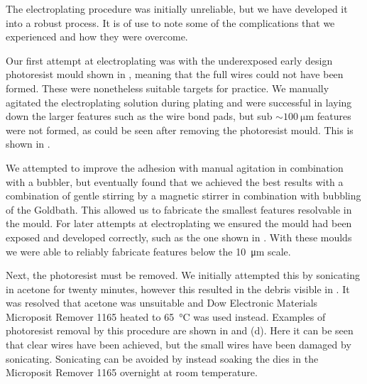 The electroplating procedure was initially unreliable, but we have developed
it into a robust process. It is of use to note some of the complications
that we experienced and how they were overcome. 

Our first attempt at electroplating was with the underexposed early design
photoresist mould shown in , meaning that the
full wires could not have been formed. These were nonetheless suitable targets
for practice. We manually agitated the electroplating solution during plating
and were successful in laying down the larger features such as the wire bond
pads, but sub $\sim\SI{100}{\micro\meter}$ features were not formed, as could be
seen after removing the photoresist mould. This is shown in 
.

We attempted to improve the adhesion with manual agitation in combination with
a bubbler, but eventually found that we achieved the best results with a
combination of gentle stirring by a magnetic stirrer in combination with
bubbling of the Goldbath. This allowed us to fabricate the smallest features
resolvable in the mould.  
%
For later attempts at electroplating we ensured the mould had been exposed and
developed correctly, such as the one shown in .
With these moulds we were able to reliably fabricate features below the
\SI{10}{\micro\meter} scale.

Next, the photoresist must be removed. We initially attempted this by 
sonicating in acetone for twenty minutes, however this resulted in the debris
visible in . It was resolved that acetone was
unsuitable and Dow Electronic Materials Microposit Remover 1165 heated to
\SI{65}{\celsius} was used instead.
%
Examples of photoresist removal by this procedure are shown in
 and (d). Here it can be seen that clear
wires have been achieved, but the small wires have been damaged by sonicating.
Sonicating can be avoided by instead soaking the dies in the Microposit Remover
1165 overnight at room temperature.

